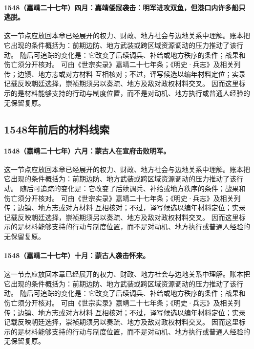 \paragraph{1548（嘉靖二十七年）四月：嘉靖倭寇袭击：明军进攻双鱼，但港口内许多船只逃脱。} 这一节点应放回本章已经展开的权力、财政、地方社会与边地关系中理解。账本把它出现的条件概括为：前期边防、地方武装或跨区域资源调动的压力推动了该行动。 随后可追踪的变化是：它改变了后续调兵、补给或地方秩序的条件；战果和伤亡须分开核对。 可由《世宗实录》嘉靖二十七年条；《明史·兵志》及相关列传；边镇、地方志或对方材料 互相核对；不过，译写候选以编年材料定位；实录记载反映朝廷选择，崇祯期须另以奏疏、地方及敌对政权材料交叉。 因而这里标示的是材料能够支持的行动与制度位置，而不是对动机、地方执行或普通人经验的无保留复原。

\subsection{1548年前后的材料线索}

\paragraph{1548（嘉靖二十七年）六月：蒙古人在宣府击败明军。} 这一节点应放回本章已经展开的权力、财政、地方社会与边地关系中理解。账本把它出现的条件概括为：前期边防、地方武装或跨区域资源调动的压力推动了该行动。 随后可追踪的变化是：它改变了后续调兵、补给或地方秩序的条件；战果和伤亡须分开核对。 可由《世宗实录》嘉靖二十七年条；《明史·兵志》及相关列传；边镇、地方志或对方材料 互相核对；不过，译写候选以编年材料定位；实录记载反映朝廷选择，崇祯期须另以奏疏、地方及敌对政权材料交叉。 因而这里标示的是材料能够支持的行动与制度位置，而不是对动机、地方执行或普通人经验的无保留复原。

\paragraph{1548（嘉靖二十七年）十月：蒙古人袭击怀来。} 这一节点应放回本章已经展开的权力、财政、地方社会与边地关系中理解。账本把它出现的条件概括为：前期边防、地方武装或跨区域资源调动的压力推动了该行动。 随后可追踪的变化是：它改变了后续调兵、补给或地方秩序的条件；战果和伤亡须分开核对。 可由《世宗实录》嘉靖二十七年条；《明史·兵志》及相关列传；边镇、地方志或对方材料 互相核对；不过，译写候选以编年材料定位；实录记载反映朝廷选择，崇祯期须另以奏疏、地方及敌对政权材料交叉。 因而这里标示的是材料能够支持的行动与制度位置，而不是对动机、地方执行或普通人经验的无保留复原。

